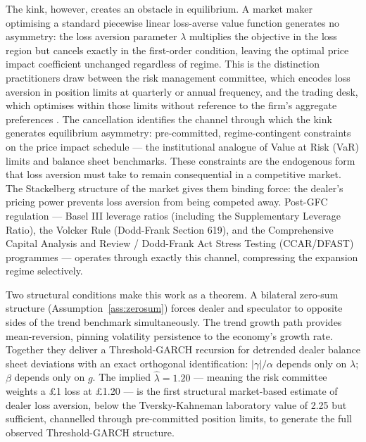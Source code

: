 \documentclass[12pt,a4paper]{article}
\theoremstyle{definition}
\begin{document}
The kink, however, creates an obstacle in equilibrium. A market maker
optimising a standard piecewise linear loss-averse value function
generates no asymmetry: the loss aversion parameter $\lambda$ multiplies
the objective in the loss region but cancels exactly in the first-order
condition, leaving the optimal price impact coefficient unchanged
regardless of regime. This is the distinction practitioners draw between
the risk management committee, which encodes loss aversion in position
limits at quarterly or annual frequency, and the trading desk, which
optimises within those limits without reference to the firm's aggregate
preferences \citep{li2025,stulz2016,ellul2013}. The cancellation
identifies the channel through which the kink generates equilibrium
asymmetry: pre-committed, regime-contingent constraints on the price
impact schedule --- the institutional analogue of Value at Risk (VaR)
limits and balance sheet benchmarks. These constraints are the
endogenous form that loss aversion must take to remain consequential in
a competitive market. The Stackelberg structure of the market gives them
binding force: the dealer's pricing power prevents loss aversion from
being competed away. Post-GFC regulation --- Basel III leverage ratios
(including the Supplementary Leverage Ratio), the Volcker Rule
(Dodd-Frank Section 619), and the Comprehensive Capital Analysis and
Review / Dodd-Frank Act Stress Testing (CCAR/DFAST) programmes ---
operates through exactly this channel, compressing the expansion regime
selectively.

Two structural conditions make this work as a theorem. A bilateral
zero-sum structure (Assumption~\ref{ass:zerosum}) forces dealer and
speculator to opposite sides of the trend benchmark simultaneously.
The trend growth path provides mean-reversion, pinning volatility
persistence to the economy's growth rate. Together they deliver a
Threshold-GARCH recursion for detrended dealer balance sheet deviations
with an exact orthogonal identification: $|\gamma|/\alpha$ depends only
on $\lambda$; $\beta$ depends only on $g$. The implied
$\hat{\lambda} = 1.20$ --- meaning the risk committee weights a
\pounds 1 loss at \pounds 1.20 --- is the first structural market-based
estimate of dealer loss aversion, below the Tversky-Kahneman laboratory
value of 2.25 but sufficient, channelled through pre-committed position
limits, to generate the full observed Threshold-GARCH structure.
\end{document}
